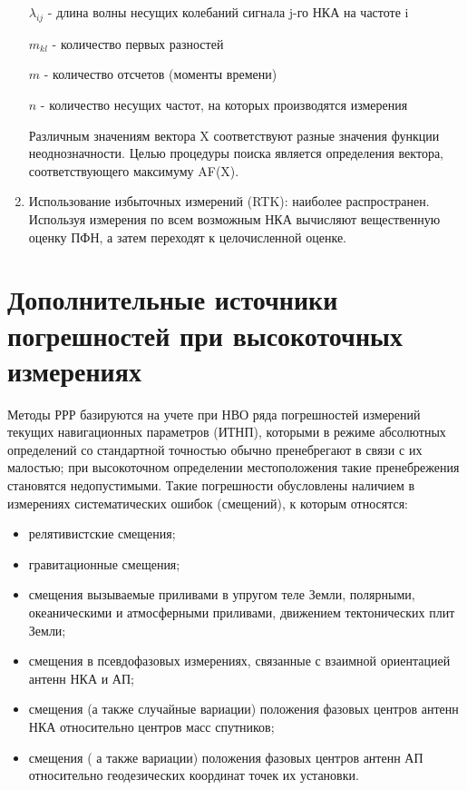 \documentclass[14pt,a4paper,oneside]{extarticle}
\begin{document}
\begin{enumerate}
    $\lambda_{ij}$ - длина волны несущих колебаний сигнала j-го НКА на частоте i

    $m_{kl}$ - количество первых разностей

    $m$ - количество отсчетов (моменты времени)

    $n$ - количество несущих частот, на которых производятся измерения

    Различным значениям вектора X соответствуют разные значения функции неоднозначности. Целью процедуры поиска является определения вектора, соответствующего максимуму AF(X).
    \item Использование избыточных измерений (RTK): наиболее распространен. Используя измерения по всем возможным НКА вычисляют вещественную оценку ПФН, а затем переходят к целочисленной оценке.
\end{enumerate}



\section{Дополнительные источники погрешностей при высокоточных измерениях}

Методы РРР базируются на учете при НВО ряда погрешностей измерений текущих навигационных параметров (ИТНП), которыми в режиме абсолютных определений со стандартной точностью обычно пренебрегают в связи с их малостью; при высокоточном определении местоположения такие пренебрежения становятся недопустимыми. Такие погрешности обусловлены наличием в измерениях систематических ошибок (смещений), к которым относятся:

\begin{itemize}
    \item релятивистские смещения;
    \item гравитационные смещения;
    \item смещения вызываемые приливами в упругом теле Земли, полярными, океаническими и атмосферными приливами, движением тектонических плит Земли;
    \item смещения в псевдофазовых измерениях, связанные с взаимной ориентацией антенн НКА и АП;
    \item смещения (а также случайные вариации) положения фазовых центров антенн НКА относительно центров масс спутников;
    \item смещения ( а также вариации) положения фазовых центров антенн АП относительно геодезических координат точек их установки.
\end{itemize}
\end{document}
